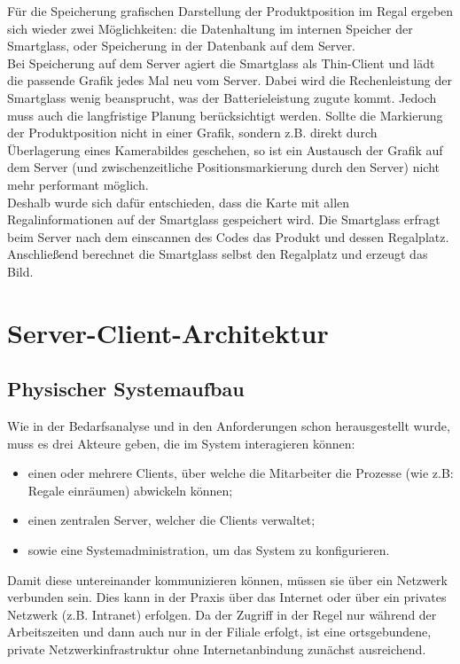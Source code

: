 Für die Speicherung grafischen Darstellung der Produktposition im Regal ergeben sich wieder zwei Möglichkeiten: die Datenhaltung im internen Speicher der Smartglass, oder Speicherung in der Datenbank auf dem Server.\\
Bei Speicherung auf dem Server agiert die Smartglass als Thin-Client und lädt die passende Grafik jedes Mal neu vom Server. Dabei wird die Rechenleistung der Smartglass wenig beansprucht, was der Batterieleistung zugute kommt. Jedoch muss auch die langfristige Planung berücksichtigt werden. Sollte die Markierung der Produktposition nicht in einer Grafik, sondern z.B. direkt durch Überlagerung eines Kamerabildes geschehen, so ist ein Austausch der Grafik auf dem Server (und zwischenzeitliche Positionsmarkierung durch den Server) nicht mehr performant möglich.\\
Deshalb wurde sich dafür entschieden, dass die Karte mit allen Regalinformationen auf der Smartglass gespeichert wird. Die Smartglass erfragt beim Server nach dem einscannen des Codes das Produkt und dessen Regalplatz. Anschließend berechnet die Smartglass selbst den Regalplatz und erzeugt das Bild.



\section{Server-Client-Architektur}
\label{sec:architektur_serverclient}

\subsection{Physischer Systemaufbau}

Wie in der Bedarfsanalyse und in den Anforderungen schon herausgestellt wurde, muss es drei Akteure geben, die im System interagieren können:

\begin{itemize}
	\item einen oder mehrere Clients, über welche die Mitarbeiter die Prozesse (wie z.B: Regale einräumen) abwickeln können;
	\item einen zentralen Server, welcher die Clients verwaltet;
	\item sowie eine Systemadministration, um das System zu konfigurieren.
\end{itemize}

Damit diese untereinander kommunizieren können, müssen sie über ein Netzwerk verbunden sein. Dies kann in der Praxis über das Internet oder über ein privates Netzwerk (z.B. Intranet) erfolgen. Da der Zugriff in der Regel nur während der Arbeitszeiten und dann auch nur in der Filiale erfolgt, ist eine ortsgebundene, private Netzwerkinfrastruktur ohne Internetanbindung zunächst ausreichend.

